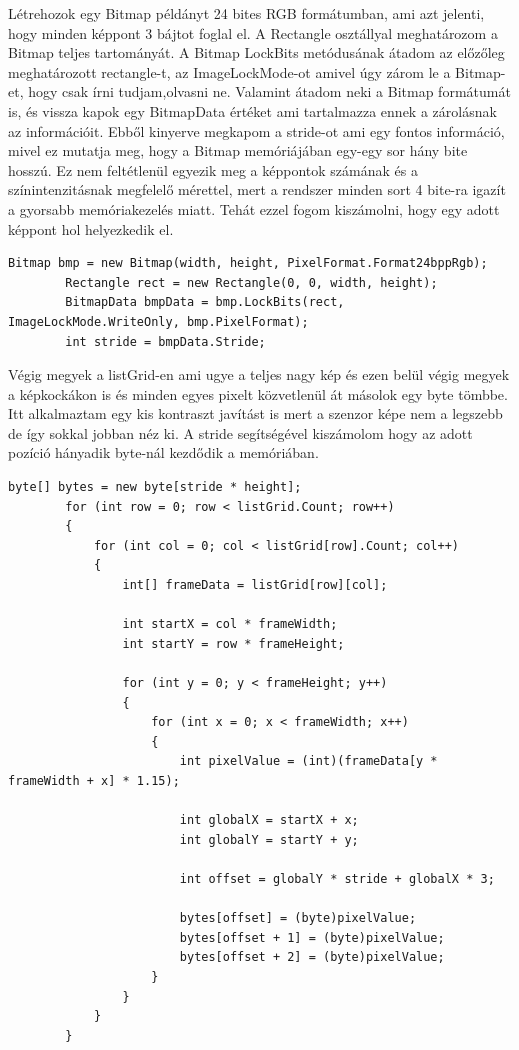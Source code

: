 \documentclass[]{thesis-ekf}
\theoremstyle{definition}
\theoremstyle{remark}
\begin{document}
Létrehozok egy Bitmap példányt 24 bites RGB formátumban, ami azt jelenti, hogy minden képpont 3 bájtot foglal el. A Rectangle osztállyal meghatározom a Bitmap teljes tartományát. A Bitmap LockBits metódusának átadom az előzőleg meghatározott rectangle-t, az ImageLockMode-ot amivel úgy zárom le a Bitmap-et, hogy csak írni tudjam,olvasni ne. Valamint átadom neki a Bitmap formátumát is, és vissza kapok egy BitmapData értéket ami tartalmazza ennek a zárolásnak az információit. Ebből kinyerve megkapom a stride-ot ami egy fontos információ, mivel ez mutatja meg, hogy a Bitmap memóriájában egy-egy sor hány bite hosszú. Ez nem feltétlenül egyezik meg a képpontok számának és a színintenzitásnak megfelelő mérettel, mert a rendszer minden sort 4 bite-ra igazít a gyorsabb memóriakezelés miatt. Tehát ezzel fogom kiszámolni, hogy egy adott képpont hol helyezkedik el.
\begin{lstlisting}[language=CSharp]	 	
	 	Bitmap bmp = new Bitmap(width, height, PixelFormat.Format24bppRgb);
	 	Rectangle rect = new Rectangle(0, 0, width, height);
	 	BitmapData bmpData = bmp.LockBits(rect, ImageLockMode.WriteOnly, bmp.PixelFormat);	 	
	 	int stride = bmpData.Stride;
\end{lstlisting}
Végig megyek a listGrid-en ami ugye a teljes nagy kép és ezen belül végig megyek a képkockákon is és minden egyes pixelt közvetlenül át másolok egy byte tömbbe. Itt alkalmaztam egy kis kontraszt javítást is mert a szenzor képe nem a legszebb de így sokkal jobban néz ki. A stride segítségével kiszámolom hogy az adott pozíció hányadik byte-nál kezdődik a memóriában.
\begin{lstlisting}[language=CSharp]	
		byte[] bytes = new byte[stride * height];
	 	for (int row = 0; row < listGrid.Count; row++)
	 	{
	 		for (int col = 0; col < listGrid[row].Count; col++)
	 		{
	 			int[] frameData = listGrid[row][col];
	 		
	 			int startX = col * frameWidth;
	 			int startY = row * frameHeight;
	 		
	 			for (int y = 0; y < frameHeight; y++)
	 			{
	 				for (int x = 0; x < frameWidth; x++)
	 				{
	 					int pixelValue = (int)(frameData[y * frameWidth + x] * 1.15); 
	 				
	 					int globalX = startX + x;
	 					int globalY = startY + y;
	 				
	 					int offset = globalY * stride + globalX * 3;
	 				
	 					bytes[offset] = (byte)pixelValue;       
	 					bytes[offset + 1] = (byte)pixelValue;   
	 					bytes[offset + 2] = (byte)pixelValue;     
	 				}
	 			}
	 		}
	 	}
\end{lstlisting}
\end{document}
